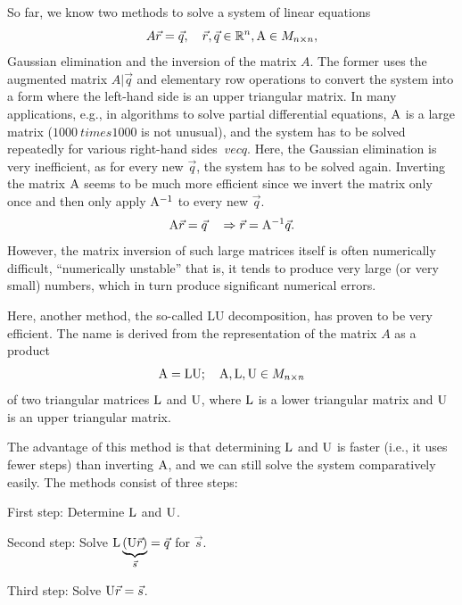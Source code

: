\documentclass[
  a4paper,
  DIV=11,
  numbers=noendperiod,
  oneside]{scrreprt}
\theoremstyle{definition}
\theoremstyle{remark}
\begin{document}
So far, we know two methods to solve a system of linear equations
\[A\vec{r} =  \vec{q},  \quad \vec{r}, \vec{q}\in \mathbb{R}^{n}, {\rm A}\in M_{n\times n},\]
Gaussian elimination and the inversion of the matrix \(A\). The former
uses the augmented matrix \(A|\vec{q}\) and elementary row operations to
convert the system into a form where the left-hand side is an upper
triangular matrix. In many applications, e.g., in algorithms to solve
partial differential equations, \({\rm A}\) is a large matrix
(\(1000 \ times 1000\) is not unusual), and the system has to be solved
repeatedly for various right-hand sides \(\ vec {q}\). Here, the
Gaussian elimination is very inefficient, as for every new \(\vec{q}\),
the system has to be solved again. Inverting the matrix \({\rm A}\)
seems to be much more efficient since we invert the matrix only once and
then only apply \({\rm A}^{-1}\) to every new \(\vec{q}\).
\[{\rm A} \vec{r} = \vec{q} \quad \Rightarrow \vec{r} =  {\rm A}^{-1}  \vec{q}.\]
However, the matrix inversion of such large matrices itself is often
numerically difficult, ``numerically unstable'' that is, it tends to
produce very large (or very small) numbers, which in turn produce
significant numerical errors.

Here, another method, the so-called LU decomposition, has proven to be
very efficient. The name is derived from the representation of the
matrix \(A\) as a product
\[{\rm A} = {\rm L}{\rm U} ;  \quad  {\rm A},  {\rm L}, {\rm U} \in M_{n\times n}\]
of two triangular matrices \({\rm L}\) and \({\rm U}\), where
\({\rm L}\) is a lower triangular matrix and \({\rm U}\) is an upper
triangular matrix.

The advantage of this method is that determining \({\rm L}\) and
\({\rm U}\) is faster (i.e., it uses fewer steps) than inverting
\({\rm A}\), and we can still solve the system comparatively easily. The
methods consist of three steps:

First step: Determine \({\rm L}\) and \({\rm U}\).

Second step: Solve
\({\rm L}\underbrace{({\rm U} \vec{r})}_{ \vec{s} }= \vec{q}\) for
\(\vec{s}\).

Third step: Solve \({\rm U} \vec{r} = \vec{s}\).
\end{document}
